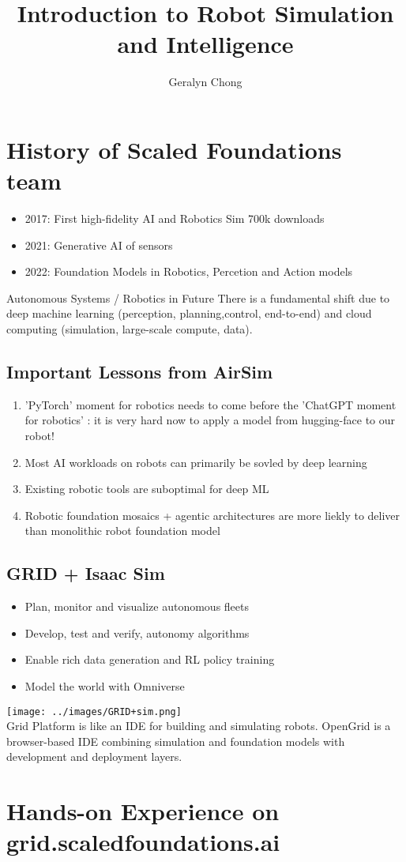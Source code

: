 \documentclass{article}
\title{Introduction to Robot Simulation and Intelligence}
\author{Geralyn Chong}
\begin{document}
\maketitle
\tableofcontents
\section{History of Scaled Foundations team}
\begin{itemize}
    \item 2017: First high-fidelity AI and Robotics Sim 700k downloads
    \item 2021: Generative AI of sensors
    \item 2022: Foundation Models in Robotics, Percetion and Action models
\end{itemize}

Autonomous Systems / Robotics in Future
There is a fundamental shift due to deep machine learning (perception, planning,control, end-to-end) and cloud computing (simulation, large-scale compute, data). 

\subsection{Important Lessons from AirSim}
\begin{enumerate}
    \item 'PyTorch' moment for robotics needs to come before the 'ChatGPT moment for robotics' : it is very hard now to apply a model from hugging-face to our robot! 
    \item Most AI workloads on robots can primarily be sovled by deep learning
    \item Existing robotic tools are suboptimal for deep ML
    \item Robotic foundation mosaics + agentic architectures are more liekly to deliver than monolithic robot foundation model
\end{enumerate}
\subsection{GRID + Isaac Sim}
\begin{itemize}
    \item Plan, monitor and visualize autonomous fleets
    \item Develop, test and verify, autonomy algorithms
    \item Enable rich data generation and RL policy training
    \item Model the world with Omniverse
\end{itemize}
\texttt{[image: ../images/GRID+sim.png]}\\

Grid Platform is like an IDE for building and simulating robots. OpenGrid is a browser-based IDE combining simulation and foundation models with development and deployment layers. 

\section{Hands-on Experience on grid.scaledfoundations.ai}
\end{document}

